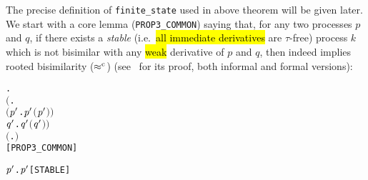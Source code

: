 The precise definition of \texttt{finite_state} used in above theorem
will be given later. We start with a core lemma (\texttt{PROP3_COMMON}) saying that, for
any two processes $p$ and $q$, if there exists a \emph{stable}
(i.e.~\hl{all immediate derivatives} are $\tau$-free)
 process $k$ which is not bisimilar with any \hl{weak} derivative of $p$ and
 $q$, then  indeed implies rooted bisimilarity
 ($\mathrel{\approx^{\rm{c}}}$) (see~\cite{van2005characterisation,Tian:2017wrba} for
 its proof, both informal and formal versions):
\begin{alltt}
\HOLTokenTurnstile{} \HOLSymConst{\HOLTokenForall{}} .
       \ensuremath{(}\HOLSymConst{\HOLTokenExists{}}.
              \HOLSymConst{\HOLTokenConj{}} \ensuremath{(}\HOLSymConst{\HOLTokenForall{}}\ensuremath{\HOLBoundVar{p}\sp{\prime}} .  \HOLTokenWeakTransBegin{}\HOLTokenWeakTransEnd \ensuremath{\HOLBoundVar{p}\sp{\prime}} \HOLSymConst{\HOLTokenImp{}} \HOLSymConst{\HOLTokenNeg{}}\ensuremath{(}\ensuremath{\HOLBoundVar{p}\sp{\prime}} \HOLSymConst{\HOLTokenWeakEQ} \ensuremath{)}\ensuremath{)} \HOLSymConst{\HOLTokenConj{}}
            \HOLSymConst{\HOLTokenForall{}}\ensuremath{\HOLBoundVar{q}\sp{\prime}} .  \HOLTokenWeakTransBegin{}\HOLTokenWeakTransEnd \ensuremath{\HOLBoundVar{q}\sp{\prime}} \HOLSymConst{\HOLTokenImp{}} \HOLSymConst{\HOLTokenNeg{}}\ensuremath{(}\ensuremath{\HOLBoundVar{q}\sp{\prime}} \HOLSymConst{\HOLTokenWeakEQ} \ensuremath{)}\ensuremath{)} \HOLSymConst{\HOLTokenImp{}}
       \ensuremath{(}\HOLSymConst{\HOLTokenForall{}}.  \HOLSymConst{\ensuremath{+}}  \HOLSymConst{\HOLTokenWeakEQ}  \HOLSymConst{\ensuremath{+}} \ensuremath{)} \HOLSymConst{\HOLTokenImp{}}
        \HOLSymConst{\HOLTokenObsCongr} \hfill{[PROP3_COMMON]}
\end{alltt}
\begin{alltt}
     \HOLTokenDefEquality{} \HOLSymConst{\HOLTokenForall{}} \ensuremath{\HOLBoundVar{p}\sp{\prime}}.  \HOLTokenTransBegin{}\HOLTokenTransEnd \ensuremath{\HOLBoundVar{p}\sp{\prime}} \HOLSymConst{\HOLTokenImp{}}  \HOLSymConst{\HOLTokenNotEqual{}} \HOLSymConst{\ensuremath{\tau}}\hfill{[STABLE]}
\end{alltt}

